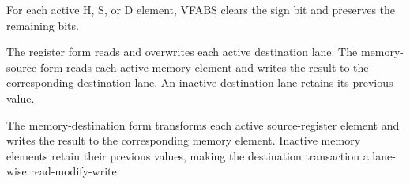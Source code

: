 For each active H, S, or D element, VFABS clears the sign bit and preserves
the remaining bits.

The register form reads and overwrites each active destination lane. The
memory-source form reads each active memory element and writes the result to the
corresponding destination lane. An inactive destination lane retains its
previous value.

The memory-destination form transforms each active source-register element and
writes the result to the corresponding memory element. Inactive memory elements
retain their previous values, making the destination transaction a lane-wise
read-modify-write.
